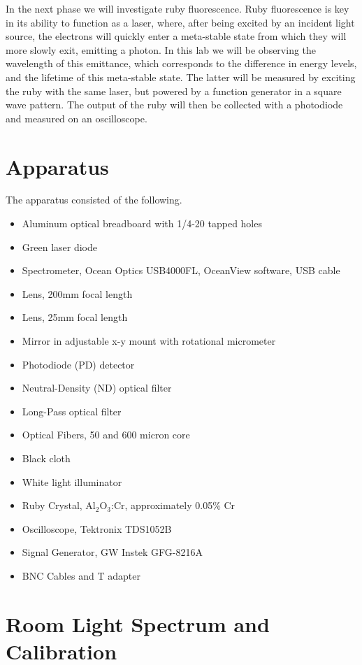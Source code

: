 \documentclass[aps,prl,reprint]{revtex4-2}
\begin{document}
In the next phase we will investigate ruby fluorescence. Ruby fluorescence is 
key in its ability to function as a laser, where, after being excited by an incident
light source, the electrons will quickly enter a meta-stable state from which they will
more slowly exit, emitting a photon. In this lab we will be observing the wavelength of
this emittance, which corresponds to the difference in energy levels, and the lifetime
of this meta-stable state. The latter will be measured by exciting the ruby with the
same laser, but powered by a function generator in a square wave pattern. The output
of the ruby will then be collected with a photodiode and measured on an oscilloscope. 


\section{Apparatus}

The apparatus consisted of the following.
\begin{itemize}
	\item Aluminum optical breadboard with 1/4-20 tapped holes
	\item Green laser diode
	\item Spectrometer, Ocean Optics USB4000FL, OceanView software, USB cable
	\item Lens, 200mm focal length
	\item Lens, 25mm focal length
	\item Mirror in adjustable x-y mount with rotational micrometer
	\item Photodiode (PD) detector
	\item Neutral-Density (ND) optical filter
	\item Long-Pass optical filter
	\item Optical Fibers, 50 and 600 micron core
	\item Black cloth
	\item White light illuminator
	\item Ruby Crystal, Al$_2$O$_3$:Cr, approximately 0.05\% Cr
	\item Oscilloscope, Tektronix TDS1052B
	\item Signal Generator, GW Instek GFG-8216A
	\item BNC Cables and T adapter
\end{itemize}

\section{Room Light Spectrum and Calibration}
\end{document}
